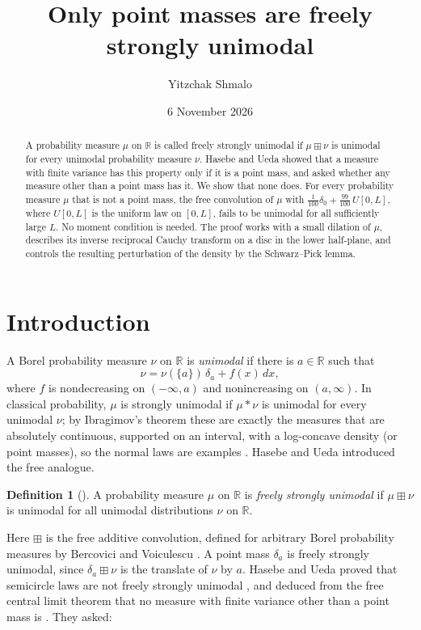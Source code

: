 \documentclass[11pt]{amsart}
\title{Only point masses are freely strongly unimodal}
\author{Yitzchak Shmalo}
\date{6 November 2026}
\theoremstyle{definition}
\newtheorem{definition}[theorem]{Definition}
\theoremstyle{remark}
\numberwithin{equation}{section}
\newcommand{\R}{\mathbb{R}}
\newcommand{\bp}{\boxplus}
\begin{document}
\begin{abstract}
A probability measure $\mu$ on $\R$ is called freely strongly unimodal if $\mu\bp\nu$ is unimodal for every unimodal probability measure $\nu$. Hasebe and Ueda showed that a measure with finite variance has this property only if it is a point mass, and asked whether any measure other than a point mass has it. We show that none does. For every probability measure $\mu$ that is not a point mass, the free convolution of $\mu$ with $\frac1{100}\delta_0+\frac{99}{100}\,U[0,L]$, where $U[0,L]$ is the uniform law on $[0,L]$, fails to be unimodal for all sufficiently large $L$. No moment condition is needed. The proof works with a small dilation of $\mu$, describes its inverse reciprocal Cauchy transform on a disc in the lower half-plane, and controls the resulting perturbation of the density by the Schwarz--Pick lemma.
\end{abstract}
\maketitle

\section{Introduction}\label{sec:intro}

A Borel probability measure $\nu$ on $\R$ is \emph{unimodal} if there is $a\in\R$ such that
\[
\nu=\nu(\{a\})\,\delta_a+f(x)\,dx,
\]
where $f$ is nondecreasing on $(-\infty,a)$ and nonincreasing on $(a,\infty)$. In classical probability, $\mu$ is strongly unimodal if $\mu*\nu$ is unimodal for every unimodal $\nu$; by Ibragimov's theorem these are exactly the measures that are absolutely continuous, supported on an interval, with a log-concave density (or point masses), so the normal laws are examples \cite[Theorem~52.3]{Sa13}. Hasebe and Ueda \cite{HU18} introduced the free analogue.

\begin{definition}[{\cite[Definition~3.8]{HU18}}]
A probability measure $\mu$ on $\R$ is \emph{freely strongly unimodal} if $\mu\bp\nu$ is unimodal for all unimodal distributions $\nu$ on $\R$.
\end{definition}

Here $\bp$ is the free additive convolution, defined for arbitrary Borel probability measures by Bercovici and Voiculescu \cite{BV93}. A point mass $\delta_a$ is freely strongly unimodal, since $\delta_a\bp\nu$ is the translate of $\nu$ by $a$. Hasebe and Ueda proved that semicircle laws are not freely strongly unimodal \cite[Lemma~3.9]{HU18}, and deduced from the free central limit theorem that no measure with finite variance other than a point mass is \cite[Theorem~3.10]{HU18}. They asked:
\end{document}
